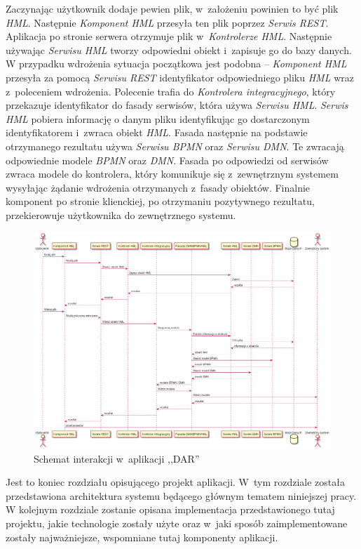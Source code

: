 Zaczynając użytkownik dodaje pewien plik, w~założeniu powinien to być plik \emph{HML}. Następnie \emph{Komponent HML} przesyła ten plik poprzez \emph{Serwis REST}. Aplikacja po stronie serwera otrzymuje plik w~\emph{Kontrolerze HML}. Następnie używając \emph{Serwisu HML} tworzy odpowiedni obiekt i~zapisuje go do bazy danych. W przypadku wdrożenia sytuacja początkowa jest podobna -- \emph{Komponent HML} przesyła za pomocą \emph{Serwisu REST} identyfikator odpowiedniego pliku \emph{HML} wraz z~poleceniem wdrożenia. Polecenie trafia do \emph{Kontrolera integracyjnego}, który przekazuje identyfikator do fasady serwisów, która używa \emph{Serwisu HML}. \emph{Serwis HML} pobiera informację o danym pliku identyfikując go dostarczonym identyfikatorem i~zwraca obiekt \emph{HML}. Fasada następnie na podstawie otrzymanego rezultatu używa \emph{Serwisu BPMN} oraz \emph{Serwisu DMN}. Te zwracają odpowiednie modele \emph{BPMN} oraz \emph{DMN}. Fasada po odpowiedzi od serwisów zwraca modele do kontrolera, który komunikuje się z~zewnętrznym systemem wysyłając żądanie wdrożenia otrzymanych z~fasady obiektów. Finalnie komponent po stronie klienckiej, po otrzymaniu pozytywnego rezultatu, przekierowuje użytkownika do zewnętrznego systemu.
\label{sec:schematInterakcji}
\begin{figure}
    \centering
    \includegraphics[width=1.4\textwidth, angle=90]{./assets/sequence.png}
    \caption{Schemat interakcji w~aplikacji ,,DAR''}
    \label{fig:sequence}
\end{figure}  
\vspace{1cm}

Jest to koniec rozdziału opisującego projekt aplikacji. W~tym rozdziale została przedstawiona architektura systemu będącego głównym tematem niniejszej pracy. W kolejnym rozdziale zostanie opisana implementacja przedstawionego tutaj projektu, jakie technologie zostały użyte oraz w~jaki sposób zaimplementowane zostały najważniejsze, wspomniane tutaj komponenty aplikacji.



